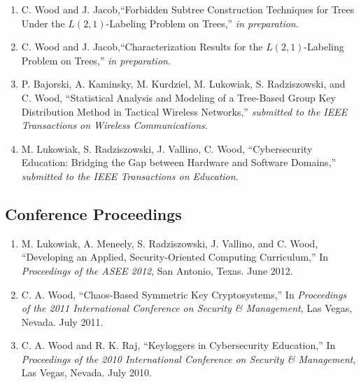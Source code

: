 \documentclass[letterpaper,11pt]{article}
\begin{document}
\begin{enumerate}[J-1.]

\item
	C. Wood and J. Jacob,``Forbidden Subtree Construction Techniques for Trees Under the $L(2,1)$-Labeling Problem on Trees,'' {\it in preparation}.

\item 
	C. Wood and J. Jacob,``Characterization Results for the $L(2,1)$-Labeling Problem on Trees,'' {\it in preparation}.

\item
	P. Bajorski, A. Kaminsky, M. Kurdziel, M. Lukowiak, S. Radziszowski, and C. Wood, ``Statistical Analysis and Modeling of a Tree-Based Group Key Distribution Method in Tactical Wireless Networks,'' {\it submitted to the IEEE Transactions on Wireless Communications}.

\item
	M. Lukowiak, S. Radziszowski, J. Vallino, C. Wood, ``Cybersecurity Education: Bridging the Gap between Hardware and Software Domains,'' {\it submitted to the IEEE Transactions on Education}.
\end{enumerate}

\subsection*{Conference Proceedings}
\begin{enumerate}[C-1.]
\item 
	M. Lukowiak, A. Meneely, S. Radziszowski, J. Vallino, and C. Wood, ``Developing an Applied, Security-Oriented Computing Curriculum,'' In {\it Proceedings of the ASEE 2012}, San Antonio, Texas. June 2012.

\item
	C. A. Wood, ``Chaos-Based Symmetric Key Cryptosystems,'' In {\it Proceedings of the 2011 International Conference on Security \& Management}, Las Vegas, Nevada. July 2011.

\item 
	C. A. Wood and R. K. Raj, ``Keyloggers in Cybersecurity Education,'' In {\it Proceedings of the 2010 International Conference on Security \& Management}, Las Vegas, Nevada. July 2010.

\end{enumerate}
\end{document}
